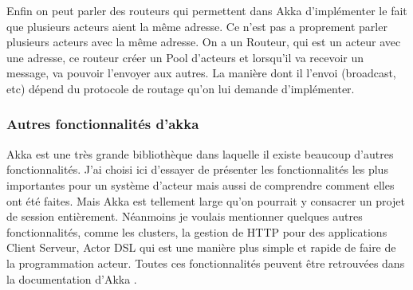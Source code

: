 \documentclass[11pt, a4paper]{article}
\begin{document}
\par Enfin on peut parler des routeurs qui permettent dans Akka d'implémenter le fait que plusieurs acteurs aient la même adresse. Ce n'est pas a proprement parler plusieurs acteurs avec la même adresse. On a un Routeur, qui est un acteur avec une adresse, ce routeur créer un Pool d'acteurs et lorsqu'il va recevoir un message, va pouvoir l'envoyer aux autres. La manière dont il l'envoi (broadcast, etc) dépend du protocole de routage qu'on lui demande d'implémenter.

\subsubsection{Autres fonctionnalités d'akka}
Akka est une très grande bibliothèque dans laquelle il existe beaucoup d'autres fonctionnalités. J'ai choisi ici d'essayer de présenter les fonctionnalités les plus importantes pour un système d'acteur mais aussi de comprendre comment elles ont été faites. Mais Akka est tellement large qu'on pourrait y consacrer un projet de session entièrement. Néanmoins je voulais mentionner quelques autres fonctionnalités, comme les clusters, la gestion de HTTP pour des applications Client Serveur, Actor DSL qui est une manière plus simple et rapide de faire de la programmation acteur. Toutes ces fonctionnalités peuvent être retrouvées dans la documentation d'Akka \cite{akka}.




\end{document}
